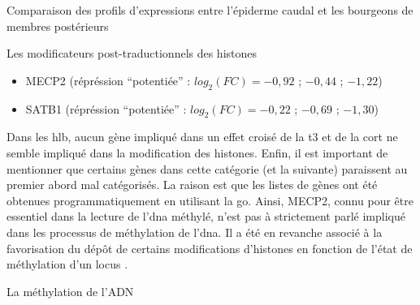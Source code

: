 \documentclass[../main.tex]{subfiles}
\begin{document}
\begin{chapter}{Comparaison des profils d'expressions entre l'épiderme caudal et les bourgeons de membres postérieurs}
\begin{section}{Les modificateurs post-traductionnels des histones}
\begin{itemize}
\item MECP2 (répréssion ``potentiée'' : $log_2(FC)=-0,92$ ; $-0,44$ ; $-1,22$)
\item SATB1 (répréssion ``potentiée'' : $log_2(FC)=-0,22$ ; $-0,69$ ; $-1,30$)
\end{itemize}
Dans les \gls{hlb}, aucun gène impliqué dans un effet croisé de la \gls{t3} et de la \gls{cort} ne semble impliqué dans la modification des histones.
Enfin, il est important de mentionner que certains gènes dans cette catégorie (et la suivante) paraissent au premier abord mal catégorisés.
La raison est que les listes de gènes ont été obtenues programmatiquement en utilisant la \gls{go}.
Ainsi, MECP2, connu pour être essentiel dans la lecture de l'\gls{dna} méthylé, n'est pas à strictement parlé impliqué dans les processus de méthylation de l'\gls{dna}.
Il a été en revanche associé à la favorisation du dépôt de certains modifications d'histones en fonction de l'état de méthylation d'un locus \citep{Fuks2003}.



\end{section}


\begin{section}{La méthylation de l'ADN}


\end{section}
\end{chapter}
\end{document}

